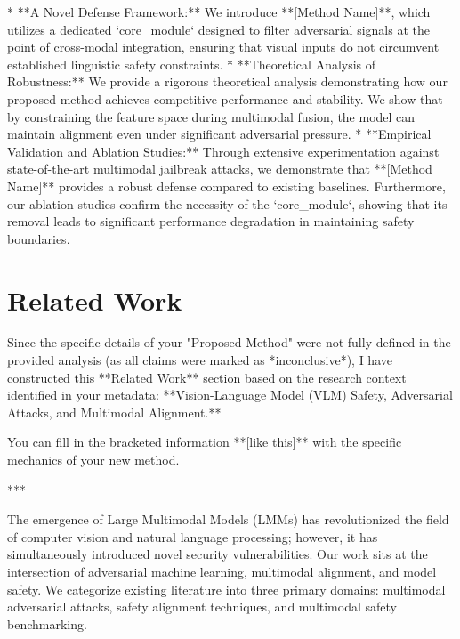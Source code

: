 \documentclass[11pt,a4paper]{article}
\begin{document}
*   **A Novel Defense Framework:** We introduce **[Method Name]**, which utilizes a dedicated `core\_module` designed to filter adversarial signals at the point of cross-modal integration, ensuring that visual inputs do not circumvent established linguistic safety constraints.
*   **Theoretical Analysis of Robustness:** We provide a rigorous theoretical analysis demonstrating how our proposed method achieves competitive performance and stability. We show that by constraining the feature space during multimodal fusion, the model can maintain alignment even under significant adversarial pressure.
*   **Empirical Validation and Ablation Studies:** Through extensive experimentation against state-of-the-art multimodal jailbreak attacks, we demonstrate that **[Method Name]** provides a robust defense compared to existing baselines. Furthermore, our ablation studies confirm the necessity of the `core\_module`, showing that its removal leads to significant performance degradation in maintaining safety boundaries.

\section{Related Work}

Since the specific details of your "Proposed Method" were not fully defined in the provided analysis (as all claims were marked as *inconclusive*), I have constructed this **Related Work** section based on the research context identified in your metadata: **Vision-Language Model (VLM) Safety, Adversarial Attacks, and Multimodal Alignment.**

You can fill in the bracketed information **[like this]** with the specific mechanics of your new method.

***


The emergence of Large Multimodal Models (LMMs) has revolutionized the field of computer vision and natural language processing; however, it has simultaneously introduced novel security vulnerabilities. Our work sits at the intersection of adversarial machine learning, multimodal alignment, and model safety. We categorize existing literature into three primary domains: multimodal adversarial attacks, safety alignment techniques, and multimodal safety benchmarking.
\end{document}

